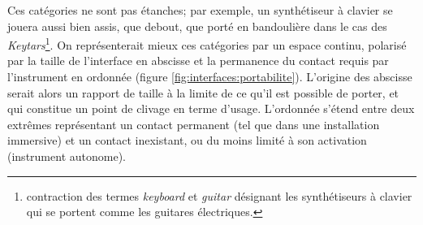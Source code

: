 \par
\noindent Ces catégories ne sont pas étanches; par exemple, un synthétiseur à clavier se jouera aussi bien assis, que debout, que porté en bandoulière dans le cas des \textit{Keytars}\footnote{contraction des termes \textit{keyboard} et \textit{guitar} désignant les synthétiseurs à clavier qui se portent comme les guitares électriques.}. On représenterait mieux ces catégories par un espace continu, polarisé par la taille de l'interface en abscisse et la permanence du contact requis par l'instrument en ordonnée (figure \ref{fig:interfaces:portabilite}). L'origine des abscisse serait alors un rapport de taille à la limite de ce qu'il est possible de porter, et qui constitue un point de clivage en terme d'usage. L'ordonnée s'étend entre deux extrêmes représentant un contact permanent (tel que dans une installation immersive) et un contact inexistant, ou du moins limité à son activation (instrument autonome).







